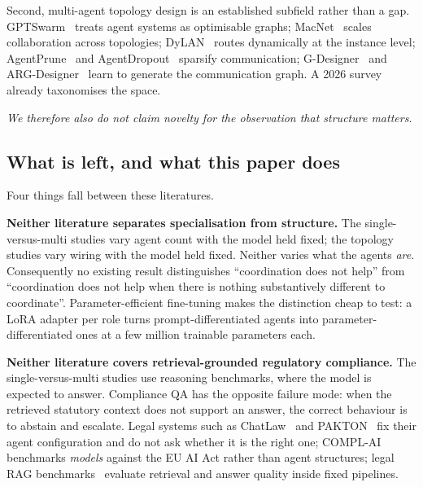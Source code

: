 \documentclass[journal,10pt,compsoc,onecolumn]{IEEEtran}
\begin{document}
Second, multi-agent topology design is an established subfield rather than a gap.
GPTSwarm~\cite{zhuge2024gptswarm} treats agent systems as optimisable graphs;
MacNet~\cite{qian2024macnet} scales collaboration across topologies;
DyLAN~\cite{liu2023dylan} routes dynamically at the instance level;
AgentPrune~\cite{zhang2024agentprune} and AgentDropout~\cite{wang2025agentdropout}
sparsify communication; G-Designer~\cite{zhang2024gdesigner} and
ARG-Designer~\cite{li2025argdesigner} learn to generate the communication graph.
A 2026 survey~\cite{zhu2026masorchestrationsurvey} already taxonomises the space.

\emph{We therefore also do not claim novelty for the observation that structure
matters.}

\subsection{What is left, and what this paper does}

Four things fall between these literatures.

\textbf{Neither literature separates specialisation from structure.} The
single-versus-multi studies vary agent count with the model held fixed; the
topology studies vary wiring with the model held fixed. Neither varies what the
agents \emph{are}. Consequently no existing result distinguishes ``coordination
does not help'' from ``coordination does not help when there is nothing
substantively different to coordinate''. Parameter-efficient fine-tuning
\cite{hu2021lora, dettmers2023qlora} makes the distinction cheap to test: a
LoRA adapter per role turns prompt-differentiated agents into
parameter-differentiated ones at a few million trainable parameters each.

\textbf{Neither literature covers retrieval-grounded regulatory compliance.} The
single-versus-multi studies use reasoning benchmarks, where the model is expected
to answer. Compliance QA has the opposite failure mode: when the retrieved
statutory context does not support an answer, the correct behaviour is to abstain
and escalate. Legal systems such as ChatLaw~\cite{cui2023chatlaw} and
PAKTON~\cite{raptopoulos2025pakton} fix their agent configuration and do not ask
whether it is the right one; COMPL-AI~\cite{guldimann2024complai} benchmarks
\emph{models} against the EU AI Act rather than agent structures; legal RAG
benchmarks~\cite{guha2023legalbench, pipitone2024legalbenchrag, li2025lexrag}
evaluate retrieval and answer quality inside fixed pipelines.
\end{document}
